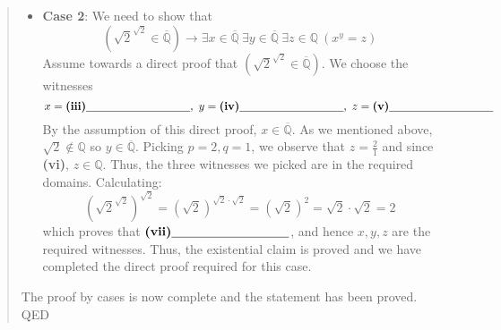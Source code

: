\documentclass[12pt, oneside]{article}
\begin{document}
\begin{enumerate}
\begin{enumerate}
\begin{quote}
\begin{itemize}
        \item {\bf Case 2}: We need to show that 
        \[
            (\sqrt{2}^{\sqrt{2}} \in \overline{\mathbb{Q}}) \to 
            \exists x \in \overline{\mathbb{Q}}~ \exists y \in \overline{\mathbb{Q}} 
            ~\exists z\in \mathbb{Q} ~(x^y = z)
        \]
        Assume towards a direct proof that $(\sqrt{2}^{\sqrt{2}} \in \overline{\mathbb{Q}})$. We
        choose the witnesses 
        \[
        x = \textbf{(iii)}\underline{\phantom{\hspace{1.3in}}}, ~y = 
        \textbf{(iv)}\underline{\phantom{\hspace{1.3in}}}, ~z = \textbf{(v)}\underline{\phantom{\hspace{1.3in}}}
        \]  
        By the assumption of this direct proof, $x \in \overline{\mathbb{Q}}$. As we mentioned above, $\sqrt{2} \notin \mathbb{Q}$ so $y \in \overline{\mathbb{Q}}$. Picking $p = 2, q = 1$, we observe that $z = \frac{2}{1}$
        and since \textbf{(vi)}\underline{\phantom{\hspace{1.3in}}}, $z \in \mathbb{Q}$.  Thus, the 
        three witnesses we picked are in the required domains. 
        Calculating: 
        \[
        \left( \sqrt{2}^{\sqrt{2}}\right)^{\sqrt{2}} = \left( \sqrt{2} \right)^{\sqrt{2} \cdot \sqrt{2} }
        = \left(\sqrt{2} \right)^2 = \sqrt{2} \cdot \sqrt{2} = 2
        \]
        which proves that $\textbf{(vii)}\underline{\phantom{\hspace{1.3in}}}$, and hence $x,y,z$ are 
        the required witnesses. Thus, the existential claim
        is proved and we have completed the direct proof required for this case.
        \end{itemize}
        The proof by cases is now complete and the statement has been proved. QED
        \end{quote}

   \end{enumerate}
   

\end{enumerate}
\end{document}
